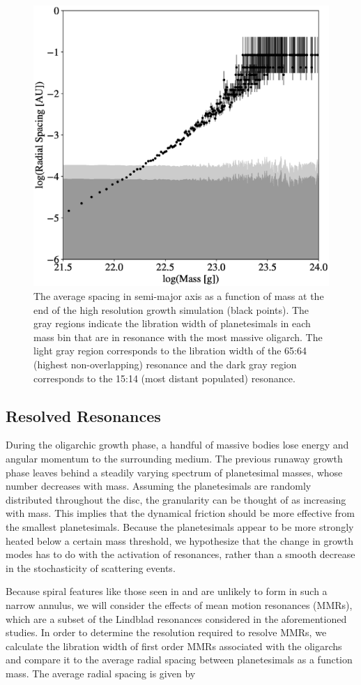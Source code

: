 \begin{figure}
    \begin{center}
    \includegraphics[width=0.5\columnwidth]{figures/plSS/res_width.eps}
    \caption{The average spacing in semi-major axis as a function of mass at the end of the high resolution growth simulation 
    (black points). The gray regions indicate the libration width of planetesimals in each mass bin that are in resonance with the 
    most massive oligarch. The light gray region corresponds to the libration width of the 65:64 (highest non-overlapping) 
    resonance and the dark gray region corresponds to the 15:14 (most distant populated) resonance.}
    \label{fig:res_mass}
    \end{center}
\end{figure}

\subsection{Resolved Resonances}\label{sec:resonances}

During the oligarchic growth phase, a handful of massive bodies lose energy and angular momentum to the surrounding 
medium. The previous runaway growth phase leaves behind a steadily varying spectrum of planetesimal masses, whose number 
decreases with mass. Assuming the planetesimals are randomly distributed throughout the disc, the granularity can be thought 
of as increasing with mass. This implies that the dynamical friction should be more effective from the smallest planetesimals. 
Because the planetesimals appear to be more strongly heated below a certain mass threshold, we hypothesize that the change 
in growth modes has to do with the activation of resonances, rather than a smooth decrease in the stochasticity of scattering 
events.

Because spiral features like those seen in \cite{weinberg07a, weinberg07b} and \cite{cionco02} are unlikely to form in such a 
narrow annulus, we will consider the effects of mean motion resonances (MMRs), which are a subset of the Lindblad resonances 
considered in the aforementioned studies. In order to determine the resolution required to resolve MMRs, we calculate the 
libration width of first order MMRs associated with the oligarchs and compare it to the average radial spacing between 
planetesimals as a function mass. The average radial spacing is given by

